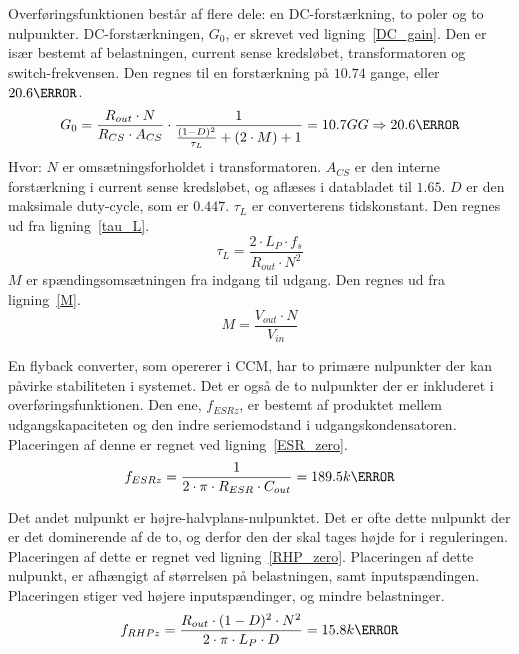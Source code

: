 Overføringsfunktionen består af flere dele: en DC-forstærkning, to poler og to nulpunkter. DC-forstærkningen, $G_0$, er skrevet ved ligning~\ref{DC_gain}. Den er især bestemt af belastningen, current sense kredsløbet, transformatoren og switch-frekvensen. Den regnes til en forstærkning på $10.74$ gange, eller $20.6\decibel$.
\begin{equation} \label{DC_gain}
G_0 = \frac{R_{out} \cdot N}{R_{CS} \cdot A_{CS}} \cdot \frac{1}{\frac{(1-D)^2}{\tau_L} + (2 \cdot M) + 1} = 10.7GG \Rightarrow 20.6\decibel
\end{equation}
\noindent Hvor:
\newline \noindent $N$ er omsætningsforholdet i transformatoren.
\newline \noindent $A_{CS}$ er den interne forstærkning i current sense kredsløbet, og aflæses i databladet til $1.65$.
\newline \noindent $D$ er den maksimale duty-cycle, som er $0.447$.
\newline \noindent $\tau_L$ er converterens tidskonstant. Den regnes ud fra ligning~\ref{tau_L}.
\begin{equation} \label{tau_L}
\tau_L = \frac{2 \cdot L_P \cdot f_s}{R_{out} \cdot N^2}
\end{equation}
\newline \noindent $M$ er spændingsomsætningen fra indgang til udgang. Den regnes ud fra ligning~\ref{M}.
\begin{equation} \label{M}
M = \frac{V_{out} \cdot N}{V_{in}}
\end{equation}

En flyback converter, som opererer i CCM, har to primære nulpunkter der kan påvirke stabiliteten i systemet. Det er også de to nulpunkter der er inkluderet i overføringsfunktionen. Den ene, $f_{ESRz}$, er bestemt af produktet mellem udgangskapaciteten og den indre seriemodstand i udgangskondensatoren. Placeringen af denne er regnet ved ligning~\ref{ESR_zero}.
\begin{equation} \label{ESR_zero}
f_{ESRz} = \frac{1}{2 \cdot \pi \cdot R_{ESR} \cdot C_{out}} = 189.5k\hertz
\end{equation}

Det andet nulpunkt er højre-halvplans-nulpunktet. Det er ofte dette nulpunkt der er det dominerende af de to, og derfor den der skal tages højde for i reguleringen. Placeringen af dette er regnet ved ligning~\ref{RHP_zero}. Placeringen af dette nulpunkt, er afhængigt af størrelsen på belastningen, samt inputspændingen. Placeringen stiger ved højere inputspændinger, og mindre belastninger. 
\begin{equation} \label{RHP_zero}
f_{RHPz} = \frac{R_{out} \cdot (1-D)^2 \cdot N^2}{2 \cdot \pi \cdot L_P \cdot D} = 15.8k\hertz
\end{equation}

